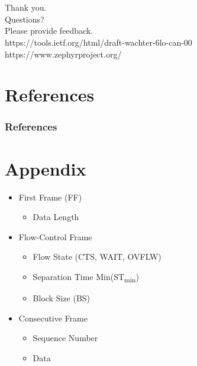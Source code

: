 \documentclass[aspectratio=169]{beamer}
\begin{document}
\section{}

\begin{frame}
	\frametitle{ }
	\vspace{40pt}
	{\Huge Thank you. \\ Questions?} \\
	\vspace{10pt}
	Please provide feedback. \\
	\vspace{20pt}
	https://tools.ietf.org/html/draft-wachter-6lo-can-00 \\
	https://www.zephyrproject.org/
\end{frame}

\section{References}
\begin{frame}
	\frametitle{References}
	\printbibliography
\end{frame}

\section{Appendix}

\begin{frame}
	\begin{minipage}[t]{0.6\textwidth}
		\begin{itemize}
			\item First Frame (FF)
				\begin{itemize}
					\item Data Length
				\end{itemize}
			\item Flow-Control Frame
				\begin{itemize}
					\item Flow State (CTS, WAIT, OVFLW)
					\item Separation Time Min(ST\textsubscript{min})
					\item Block Size (BS)
				\end{itemize}
			\item Consecutive Frame
				\begin{itemize}
					\item Sequence Number
					\item Data
				\end{itemize}
		\end{itemize}
	\end{minipage}
	\begin{minipage}[t]{0.39\textwidth}
		
	\end{minipage}
\end{frame}
\end{document}
